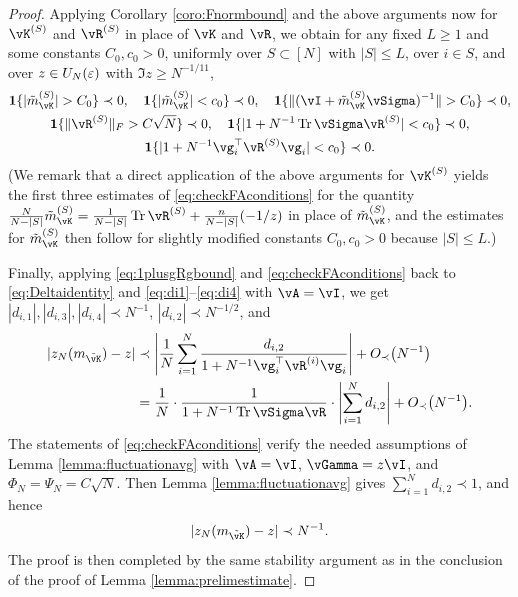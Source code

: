 \begin{proof}
Applying Corollary \ref{coro:Fnormbound} and the above arguments now
for $\vK^{(S)}$ and $\vR^{(S)}$ in place of $\vK$
and $\vR$, we obtain for any fixed $L \geq 1$ and
some constants $C_0,c_0>0$, uniformly over $S \subset [N]$ with $|S| \leq L$,
over $i \in S$, and over $z \in U_N(\varepsilon)$ with $\Im z \geq N^{-1/11}$,
\begin{equation}\label{eq:checkFAconditions}
\begin{gathered}
\bI\{|\tilde m_{\vK}^{(S)}|>C_0\} \prec 0,
\quad \bI\{|\tilde m_{\vK}^{(S)}|<c_0\} \prec 0,
\quad \bI\{\|(\vI+\tilde m_{\vK}^{(S)}\vSigma)^{-1}\|>C_0\} \prec 0,\\
\bI\{\|\vR^{(S)}\|_F>C\sqrt{N}\} \prec 0,
\quad \bI\{|1+N^{-1}\Tr \vSigma\vR^{(S)}|<c_0\} \prec 0,\\
\bI\{|1+N^{-1}\vg_i^\top \vR^{(S)}\vg_i|<c_0\} \prec 0.
\end{gathered}
\end{equation}
(We remark that a direct application of the above arguments for $\vK^{(S)}$
yields the first three estimates of \eqref{eq:checkFAconditions} for the
quantity $\frac{N}{N-|S|} \tilde m_{\vK}^{(S)}=\frac{1}{N-|S|}\Tr
\vR^{(S)}+\frac{n}{N-|S|}(-1/z)$ in place of $\tilde m_{\vK}^{(S)}$,
and the estimates for $\tilde m_{\vK}^{(S)}$ then follow for slightly modified
constants $C_0,c_0>0$ because $|S| \leq L$.)

Finally, applying \eqref{eq:1plusgRgbound} and \eqref{eq:checkFAconditions}
back to \eqref{eq:Deltaidentity} and \eqref{eq:di1}--\eqref{eq:di4} with
$\vA=\vI$, we get $|d_{i,1}|,|d_{i,3}|,|d_{i,4}| \prec N^{-1}$,
$|d_{i,2}| \prec N^{-1/2}$, and
\begin{align*}
|z_N(m_{\tilde \vK})-z| &\prec \left|\frac{1}{N}\sum_{i=1}^N \frac{d_{i,2}}
{1+N^{-1}\vg_i^\top \vR^{(i)}\vg_i}\right|+\SD{N^{-1}}\\
&=\frac{1}{N} \cdot \frac{1}{1+N^{-1}\Tr \vSigma\vR}
\cdot \left|\sum_{i=1}^N d_{i,2}\right|+\SD{N^{-1}}.
\end{align*}
The statements of \eqref{eq:checkFAconditions} verify the needed assumptions
of Lemma \ref{lemma:fluctuationavg} with $\vA=\vI$, $\vGamma=z\vI$, and
$\Phi_N=\Psi_N=C\sqrt{N}$. Then Lemma \ref{lemma:fluctuationavg}
gives $\sum_{i=1}^N d_{i,2} \prec 1$, and hence
\[|z_N(m_{\tilde \vK})-z| \prec N^{-1}.\]
The proof is then completed by the same stability argument as in the conclusion
of the proof of Lemma \ref{lemma:prelimestimate}.
\end{proof}

